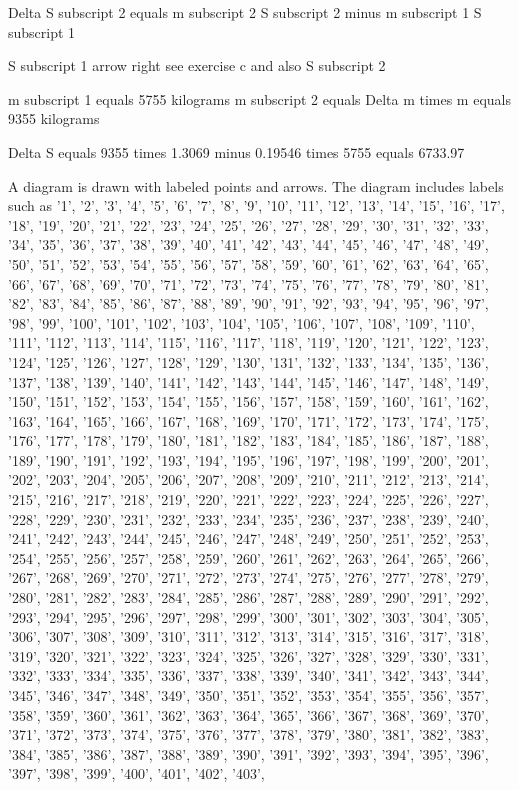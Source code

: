 Delta S subscript 2 equals m subscript 2 S subscript 2 minus m subscript 1 S subscript 1

S subscript 1 arrow right see exercise c and also S subscript 2

m subscript 1 equals 5755 kilograms m subscript 2 equals Delta m times m equals 9355 kilograms

Delta S equals 9355 times 1.3069 minus 0.19546 times 5755 equals 6733.97

A diagram is drawn with labeled points and arrows. The diagram includes labels such as '1', '2', '3', '4', '5', '6', '7', '8', '9', '10', '11', '12', '13', '14', '15', '16', '17', '18', '19', '20', '21', '22', '23', '24', '25', '26', '27', '28', '29', '30', '31', '32', '33', '34', '35', '36', '37', '38', '39', '40', '41', '42', '43', '44', '45', '46', '47', '48', '49', '50', '51', '52', '53', '54', '55', '56', '57', '58', '59', '60', '61', '62', '63', '64', '65', '66', '67', '68', '69', '70', '71', '72', '73', '74', '75', '76', '77', '78', '79', '80', '81', '82', '83', '84', '85', '86', '87', '88', '89', '90', '91', '92', '93', '94', '95', '96', '97', '98', '99', '100', '101', '102', '103', '104', '105', '106', '107', '108', '109', '110', '111', '112', '113', '114', '115', '116', '117', '118', '119', '120', '121', '122', '123', '124', '125', '126', '127', '128', '129', '130', '131', '132', '133', '134', '135', '136', '137', '138', '139', '140', '141', '142', '143', '144', '145', '146', '147', '148', '149', '150', '151', '152', '153', '154', '155', '156', '157', '158', '159', '160', '161', '162', '163', '164', '165', '166', '167', '168', '169', '170', '171', '172', '173', '174', '175', '176', '177', '178', '179', '180', '181', '182', '183', '184', '185', '186', '187', '188', '189', '190', '191', '192', '193', '194', '195', '196', '197', '198', '199', '200', '201', '202', '203', '204', '205', '206', '207', '208', '209', '210', '211', '212', '213', '214', '215', '216', '217', '218', '219', '220', '221', '222', '223', '224', '225', '226', '227', '228', '229', '230', '231', '232', '233', '234', '235', '236', '237', '238', '239', '240', '241', '242', '243', '244', '245', '246', '247', '248', '249', '250', '251', '252', '253', '254', '255', '256', '257', '258', '259', '260', '261', '262', '263', '264', '265', '266', '267', '268', '269', '270', '271', '272', '273', '274', '275', '276', '277', '278', '279', '280', '281', '282', '283', '284', '285', '286', '287', '288', '289', '290', '291', '292', '293', '294', '295', '296', '297', '298', '299', '300', '301', '302', '303', '304', '305', '306', '307', '308', '309', '310', '311', '312', '313', '314', '315', '316', '317', '318', '319', '320', '321', '322', '323', '324', '325', '326', '327', '328', '329', '330', '331', '332', '333', '334', '335', '336', '337', '338', '339', '340', '341', '342', '343', '344', '345', '346', '347', '348', '349', '350', '351', '352', '353', '354', '355', '356', '357', '358', '359', '360', '361', '362', '363', '364', '365', '366', '367', '368', '369', '370', '371', '372', '373', '374', '375', '376', '377', '378', '379', '380', '381', '382', '383', '384', '385', '386', '387', '388', '389', '390', '391', '392', '393', '394', '395', '396', '397', '398', '399', '400', '401', '402', '403', 